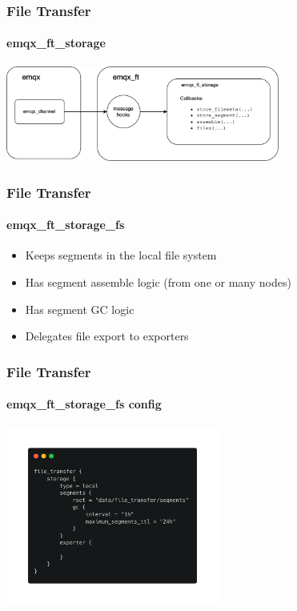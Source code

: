 \documentclass{beamer}
\begin{document}
\begin{frame}
    \frametitle{File Transfer}
    \framesubtitle{emqx\_ft\_storage}

    \begin{center}
        \includegraphics[width=9cm, keepaspectratio]{images/ft_storage.png}
    \end{center}
\end{frame}


\begin{frame}
    \frametitle{File Transfer}
    \framesubtitle{emqx\_ft\_storage\_fs}
    \begin{itemize}
        \item Keeps segments in the local file system
        \item Has segment assemble logic (from one or many nodes)
        \item Has segment GC logic
        \item Delegates file export to exporters
    \end{itemize}
    \begin{center}
    \end{center}
\end{frame}

\begin{frame}
    \frametitle{File Transfer}
    \framesubtitle{emqx\_ft\_storage\_fs config}

    \begin{center}
        \includegraphics[width=7cm, keepaspectratio]{images/ft_storage_fs_conf.png}
    \end{center}
\end{frame}
\end{document}
